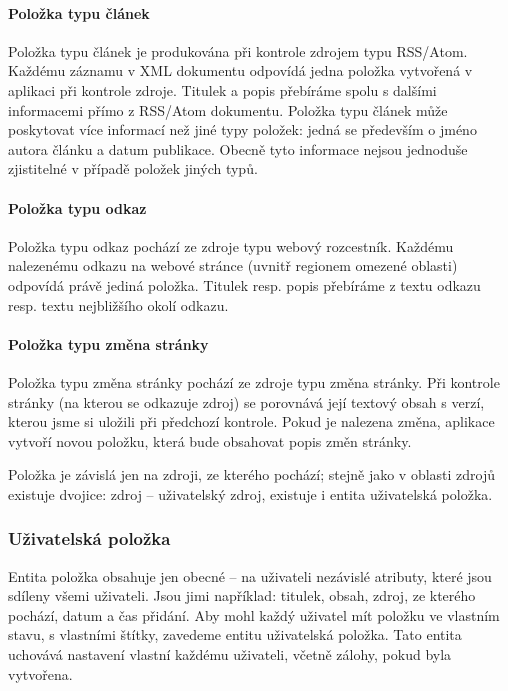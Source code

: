 \paragraph{Položka typu článek}

Položka typu článek je produkována při kontrole zdrojem typu RSS/Atom.
Každému záznamu v XML dokumentu odpovídá jedna položka vytvořená v aplikaci při kontrole zdroje.
Titulek a popis přebíráme spolu s dalšími informacemi přímo z RSS/Atom dokumentu.
Položka typu článek může poskytovat více informací než jiné typy položek: jedná se především o jméno autora článku a datum publikace.
Obecně tyto informace nejsou jednoduše zjistitelné v případě položek jiných typů.

\paragraph{Položka typu odkaz}

Položka typu odkaz pochází ze zdroje typu webový rozcestník.
Každému nalezenému odkazu na webové stránce (uvnitř regionem omezené oblasti) odpovídá právě jediná položka.
Titulek resp. popis přebíráme z textu odkazu resp. textu nejbližšího okolí odkazu.

\paragraph{Položka typu změna stránky}

Položka typu změna stránky pochází ze zdroje typu změna stránky.
Při kontrole stránky (na kterou se odkazuje zdroj) se porovnává její textový obsah s verzí, kterou jsme si uložili při předchozí kontrole.
Pokud je nalezena změna, aplikace vytvoří novou položku, která bude obsahovat popis změn stránky.

\bigskip

Položka je závislá jen na zdroji, ze kterého pochází; stejně jako v oblasti zdrojů existuje dvojice: zdroj -- uživatelský zdroj, existuje i entita uživatelská položka.

\subsubsection{Uživatelská položka}

Entita položka obsahuje jen obecné -- na uživateli nezávislé atributy, které jsou sdíleny všemi uživateli.
Jsou jimi například: titulek, obsah, zdroj, ze kterého pochází, datum a čas přidání.
Aby mohl každý uživatel mít položku ve vlastním stavu, s vlastními štítky, zavedeme entitu uživatelská položka.
Tato entita uchovává nastavení vlastní každému uživateli, včetně zálohy, pokud byla vytvořena.

